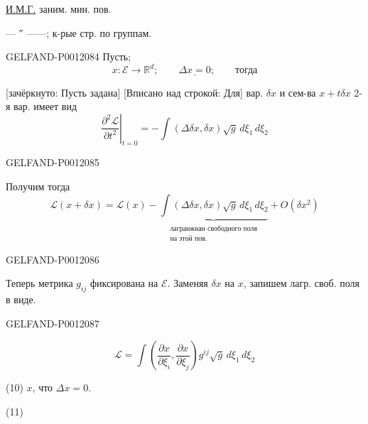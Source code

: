 \underline{И.М.Г.}\quad {} заним. мин. пов.

\quad --- ″ ------; к-рые стр. по группам.

\begin{GelfandAdjacentEvidence}{GELFAND-P001208}{4}
Пусть;
\begin{equation*}
x:\mathcal E\longrightarrow\mathbb R^d;
\qquad\underline{\Delta x=0};\qquad\text{тогда}
\tag{6}
\end{equation*}

[зачёркнуто: Пусть задана] [Вписано над строкой: Для]
вар. \(\delta x\) и сем-ва \(x+t\delta x\) 2-я вар. имеет вид
\begin{equation*}
\left.\frac{\partial^2\mathcal L}{\partial t^2}\right|_{t=0}
=-\int(\Delta\delta x,\delta x)\sqrt g\,d\xi_1\,d\xi_2
\tag{7}
\end{equation*}
\end{GelfandAdjacentEvidence}
\begin{GelfandAdjacentEvidence}{GELFAND-P001208}{5}


Получим тогда
\begin{equation*}
\mathcal L(x+\delta x)=\mathcal L(x)-
\underbrace{\int(\Delta\delta x,\delta x)\sqrt g\,d\xi_1\,d\xi_2}_{
\substack{\text{лагранжиан свободного поля}\\\text{на этой пов.}}}
+O(\delta x^2)
\tag{8}
\end{equation*}
\end{GelfandAdjacentEvidence}
\begin{GelfandAdjacentEvidence}{GELFAND-P001208}{6}


Теперь метрика \(g_{ij}\) фиксирована на \(\mathcal E\).
Заменяя \(\delta x\) на \(x\), запишем лагр. своб. поля в виде.
\end{GelfandAdjacentEvidence}
\begin{GelfandAdjacentEvidence}{GELFAND-P001208}{7}


\begin{equation*}
\mathcal L=\int\left(\frac{\partial x}{\partial\xi_i},
\frac{\partial x}{\partial\xi_j}\right)g^{ij}\sqrt g\,d\xi_1\,d\xi_2
\tag{9}
\end{equation*}

(10)\quad {} \(x\), что \(\Delta x=0\).

(11)\quad {}
\end{GelfandAdjacentEvidence}
